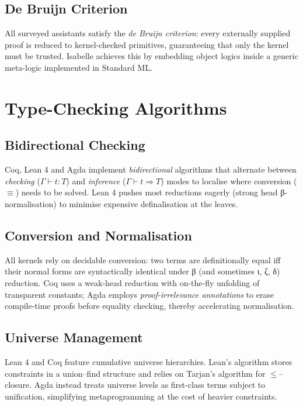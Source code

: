 \documentclass[11pt,a4paper]{article}
\begin{document}
\subsection{De Bruijn Criterion}
All surveyed assistants satisfy the \emph{de Bruijn criterion}: every externally supplied proof is reduced to kernel-checked primitives, guaranteeing that only the kernel must be trusted\cite{coq-core}.  Isabelle achieves this by embedding object logics inside a generic meta-logic implemented in Standard ML\cite{isabelle-manual}.  

\section{Type-Checking Algorithms}
\subsection{Bidirectional Checking}
Coq, Lean 4 and Agda implement \emph{bidirectional} algorithms that alternate between
\emph{checking} (\(\Gamma\vdash t:\!T\)) and \emph{inference} (\(\Gamma\vdash t\Rightarrow T\)) modes to localise where
conversion (\(\equiv\)) needs to be solved\cite{bidirectional-cic,tc-cic}.  
Lean 4 pushes most reductions eagerly (strong head β-normalisation) to minimise expensive definalisation at the leaves\cite{lean4-survey,lean4lean}.  

\subsection{Conversion and Normalisation}
All kernels rely on decidable conversion: two terms are definitionally equal iff their
normal forms are syntactically identical under β (and sometimes ι, ζ, δ) reduction.  
Coq uses a weak-head reduction with on-the-fly unfolding of transparent constants;  
Agda employs \emph{proof-irrelevance annotations} to erase compile-time proofs before equality checking, thereby accelerating normalisation\cite{agda-note}.  

\subsection{Universe Management}
Lean 4 and Coq feature cumulative universe hierarchies.  Lean’s algorithm stores
constraints in a union–find structure and relies on Tarjan’s algorithm for \(\le\)–closure\cite{lean4-survey}.  
Agda instead treats universe levels as first-class terms subject to unification, simplifying metaprogramming at the cost of heavier constraints\cite{agda-guide}.  
\end{document}
